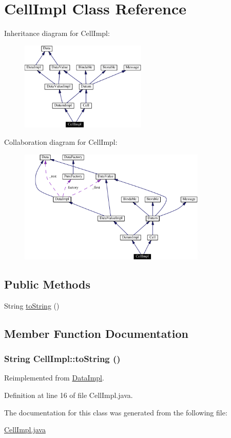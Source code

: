 \hypertarget{classCellImpl}{
\section{Cell\-Impl  Class Reference}
\label{classCellImpl}
}
Inheritance diagram for Cell\-Impl:\begin{figure}[H]
\begin{center}
\leavevmode
\includegraphics[width=170pt]{classCellImpl__inherit__graph}
\end{center}
\end{figure}
Collaboration diagram for Cell\-Impl:\begin{figure}[H]
\begin{center}
\leavevmode
\includegraphics[width=253pt]{classCellImpl__coll__graph}
\end{center}
\end{figure}
\subsection*{Public Methods}
\begin{CompactItemize}
\item 
String \hyperlink{classCellImpl_a0}{to\-String} ()
\end{CompactItemize}


\subsection{Member Function Documentation}
\hypertarget{classCellImpl_a0}{
\subsubsection[toString]{\setlength{\rightskip}{0pt plus 5cm}String Cell\-Impl::to\-String ()}}
\label{classCellImpl_a0}




Reimplemented from \hyperlink{classDataImpl_a6}{Data\-Impl}.

Definition at line 16 of file Cell\-Impl.java.

The documentation for this class was generated from the following file:\begin{CompactItemize}
\item 
\hyperlink{CellImpl_8java-source}{Cell\-Impl.java}\end{CompactItemize}

